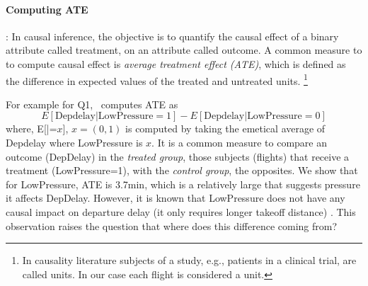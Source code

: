  \paragraph{ \bf Computing ATE}: In causal inference, the objective is to quantify
 the causal effect of a binary attribute called treatment, on an attribute called outcome.
 A common measure to to compute causal effect is {\em average treatment effect (ATE)}, which is defined as the difference in expected values of the treated and untreated units. \footnote{In causality literature subjects of a study,
  e.g., patients in a clinical trial, are called units. In our case each flight is considered a unit.}

   For example for Q1, \GSQL\ computes ATE as $$E[\text{Depdelay}|\text{LowPressure}=1] - E[\text{Depdelay}|\text{LowPressure}=0]$$
  where, E[|=$x$], $x=(0,1)$ is computed by taking the emetical average of  Depdelay where LowPressure is  $x$. It is a  common measure to compare an
  outcome (DepDelay) in the {\em treated group},  those subjects (flights) that receive a treatment (LowPressure=1), with the {\em control group}, the opposites.
  We show that for LowPressure, ATE is 3.7min, which is a relatively large that suggests pressure it affects DepDelay. However, it is known that
  LowPressure does not have any causal impact on departure delay (it only requires longer takeoff distance) \cite{FAA08}. This observation raises the question that  where does this difference coming from?


